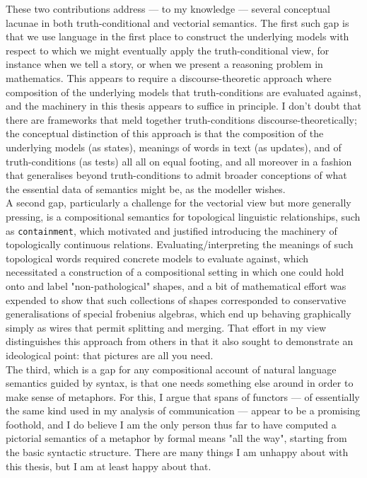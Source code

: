 These two contributions address --- to my knowledge --- several conceptual lacunae in both truth-conditional and vectorial semantics. The first such gap is that we use language in the first place to construct the underlying models with respect to which we might eventually apply the truth-conditional view, for instance when we tell a story, or when we present a reasoning problem in mathematics. This appears to require a discourse-theoretic approach where composition of the underlying models that truth-conditions are evaluated against, and the machinery in this thesis appears to suffice in principle. I don't doubt that there are frameworks that meld together truth-conditions discourse-theoretically; the conceptual distinction of this approach is that the composition of the underlying models (as states), meanings of words in text (as updates), and of truth-conditions (as tests) all all on equal footing, and all moreover in a fashion that generalises beyond truth-conditions to admit broader conceptions of what the essential data of semantics might be, as the modeller wishes.\\

A second gap, particularly a challenge for the vectorial view but more generally pressing, is a compositional semantics for topological linguistic relationships, such as \texttt{containment}, which motivated and justified introducing the machinery of topologically continuous relations. Evaluating/interpreting the meanings of such topological words required concrete models to evaluate against, which necessitated a construction of a compositional setting in which one could hold onto and label "non-pathological" shapes, and a bit of mathematical effort was expended to show that such collections of shapes corresponded to conservative generalisations of special frobenius algebras, which end up behaving graphically simply as wires that permit splitting and merging. That effort in my view distinguishes this approach from others in that it also sought to demonstrate an ideological point: that pictures are all you need.\\

The third, which is a gap for any compositional account of natural language semantics guided by syntax, is that one needs something else around in order to make sense of metaphors. For this, I argue that spans of functors --- of essentially the same kind used in my analysis of communication --- appear to be a promising foothold, and I do believe I am the only person thus far to have computed a pictorial semantics of a metaphor by formal means "all the way", starting from the basic syntactic structure. There are many things I am unhappy about with this thesis, but I am at least happy about that.